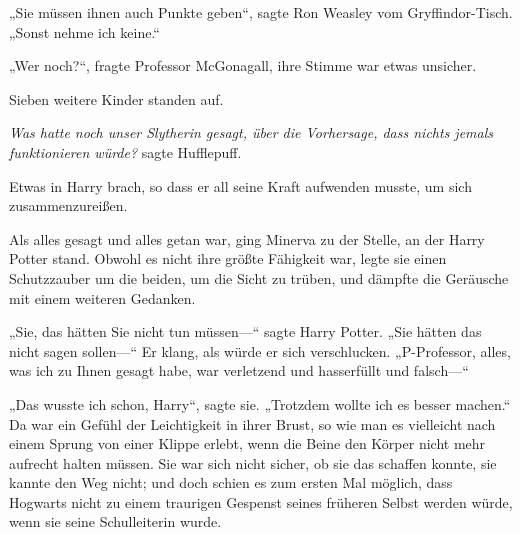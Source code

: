 „Sie müssen ihnen auch Punkte geben“, sagte Ron Weasley vom Gryffindor-Tisch.
„Sonst nehme ich keine.“

„Wer noch?“, fragte Professor McGonagall, ihre Stimme war etwas unsicher.

Sieben weitere Kinder standen auf.

\emph{Was hatte noch unser Slytherin gesagt, über die Vorhersage, dass nichts jemals funktionieren würde?} sagte Hufflepuff.

Etwas in Harry brach, so dass er all seine Kraft aufwenden musste, um sich zusammenzureißen.

\later

Als alles gesagt und alles getan war, ging Minerva zu der Stelle, an der Harry Potter stand. Obwohl es nicht ihre größte Fähigkeit war, legte sie einen Schutzzauber um die beiden, um die Sicht zu trüben, und dämpfte die Geräusche mit einem weiteren Gedanken.

„Sie, das hätten Sie nicht tun müssen—“ sagte Harry Potter.
„Sie hätten das nicht sagen sollen—“ Er klang, als würde er sich verschlucken.
„P-Professor, alles, was ich zu Ihnen gesagt habe, war verletzend und hasserfüllt und falsch—“

„Das wusste ich schon, Harry“, sagte sie.
„Trotzdem wollte ich es besser machen.“ Da war ein Gefühl der Leichtigkeit in ihrer Brust, so wie man es vielleicht nach einem Sprung von einer Klippe erlebt, wenn die Beine den Körper nicht mehr aufrecht halten müssen. Sie war sich nicht sicher, ob sie das schaffen konnte, sie kannte den Weg nicht; und doch schien es zum ersten Mal möglich, dass Hogwarts nicht zu einem traurigen Gespenst seines früheren Selbst werden würde, wenn sie seine Schulleiterin wurde.

